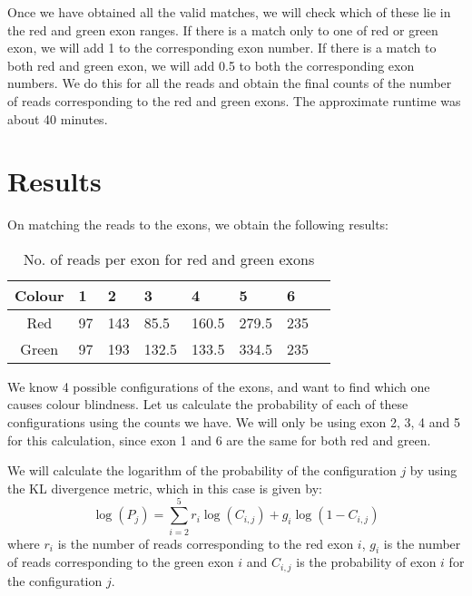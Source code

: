 \documentclass[12pt]{article}
\begin{document}
Once we have obtained all the valid matches, we will check which of these lie in the red and green exon ranges. If there is a match only to one of red or green exon, we will add 1 to the corresponding exon number. If there is a match to both red and green exon, we will add 0.5 to both the corresponding exon numbers. We do this for all the reads and obtain the final counts of the number of reads corresponding to the red and green exons. The approximate runtime was about 40 minutes.

\section*{Results}
On matching the reads to the exons, we obtain the following results:

\begin{table}[H]
    \centering
    \begin{tabularx}{0.9\textwidth}{|c| *{7}{Y|}}
        \hline
        Colour & 1 & 2 & 3 & 4 & 5 & 6 \\
        \hline
        Red & 97 & 143 & 85.5 & 160.5 & 279.5 & 235 \\
        \hline
        Green & 97 & 193 & 132.5 & 133.5 & 334.5 & 235 \\
        \hline
    \end{tabularx}
    \caption{No. of reads per exon for red and green exons}
\end{table}

We know 4 possible configurations of the exons, and want to find which one causes colour blindness. Let us calculate the probability of each of these configurations using the counts we have. We will only be using exon 2, 3, 4 and 5 for this calculation, since exon 1 and 6 are the same for both red and green.

We will calculate the logarithm of the probability of the configuration $j$ by using the KL divergence metric, which in this case is given by:
\begin{equation*}
    \log (P_j) = \sum_{i=2}^{5} r_i \log (C_{i,j}) + g_i \log (1 - C_{i,j})
\end{equation*}
where $r_i$ is the number of reads corresponding to the red exon $i$, $g_i$ is the number of reads corresponding to the green exon $i$ and $C_{i,j}$ is the probability of exon $i$ for the configuration $j$. 
\end{document}
